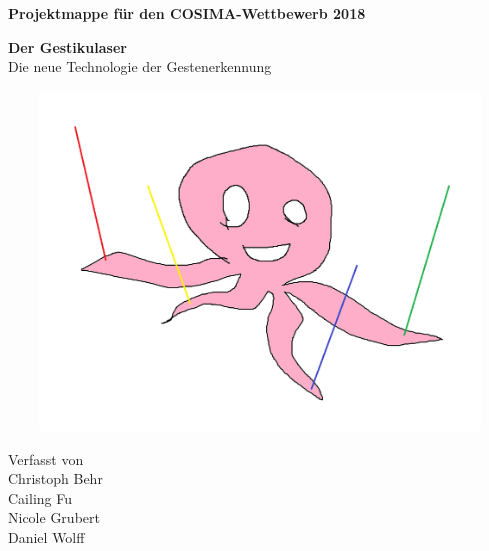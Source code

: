 
\begin{titlepage}

    
    \small
	\parindent0pt
	
	\begin{center}
		\bfseries Projektmappe für den COSIMA-Wettbewerb 2018
	\end{center}
	\vspace*{15mm}
	\normalsize	
	\begin{center}
		\huge
		{\bfseries\sffamily Der Gestikulaser}
		\\ \vspace*{4mm}
		\large
		Die neue Technologie der Gestenerkennung
	\end{center}
	\vfill
	\begin{center}
	\large \mydate{\today}
	\end{center}
	\includegraphics[width=15cm,height=9cm]{figures/GestikulaserLogo.png}
	\vfill
	\begin{center}
		Verfasst von \\[3ex]
		Christoph Behr \\
		Cailing Fu \\
		Nicole Grubert \\
		Daniel Wolff \\
	\end{center}
\end{titlepage}